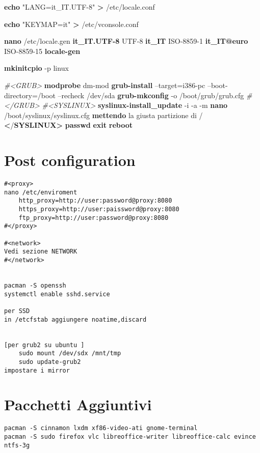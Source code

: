 \documentclass[]{article}
\newenvironment{Shaded}{}{}
\newcommand{\KeywordTok}[1]{\textcolor[rgb]{0.00,0.44,0.13}{\textbf{{#1}}}}
\newcommand{\StringTok}[1]{\textcolor[rgb]{0.25,0.44,0.63}{{#1}}}
\newcommand{\CommentTok}[1]{\textcolor[rgb]{0.38,0.63,0.69}{\textit{{#1}}}}
\newcommand{\NormalTok}[1]{{#1}}
\begin{document}
\begin{Shaded}
\begin{Highlighting}[]
\KeywordTok{echo} \StringTok{"LANG=it_IT.UTF-8"} \KeywordTok{>} \NormalTok{/etc/locale.conf  }

\KeywordTok{echo} \StringTok{"KEYMAP=it"} \KeywordTok{>} \NormalTok{/etc/vconsole.conf}

\KeywordTok{nano} \NormalTok{/etc/locale.gen}
    \KeywordTok{it_IT.UTF-8} \NormalTok{UTF-8  }
    \KeywordTok{it_IT} \NormalTok{ISO-8859-1  }
    \KeywordTok{it_IT@euro} \NormalTok{ISO-8859-15}
\KeywordTok{locale-gen}

\KeywordTok{mkinitcpio} \NormalTok{-p linux}

\CommentTok{#<GRUB>}
\KeywordTok{modprobe} \NormalTok{dm-mod}
\KeywordTok{grub-install} \NormalTok{--target=i386-pc --boot-directory=/boot --recheck /dev/sda}
\KeywordTok{grub-mkconfig} \NormalTok{-o /boot/grub/grub.cfg}
\CommentTok{#</GRUB>}
\CommentTok{#<SYSLINUX>}
\KeywordTok{syslinux-install_update} \NormalTok{-i -a -m}
\KeywordTok{nano} \NormalTok{/boot/syslinux/syslinux.cfg}
    \KeywordTok{mettendo} \NormalTok{la giusta partizione di /}
\KeywordTok{<}\NormalTok{/}\KeywordTok{SYSLINUX>}
\KeywordTok{passwd}
\KeywordTok{exit}
\KeywordTok{reboot}
\end{Highlighting}
\end{Shaded}

\section{Post configuration}\label{post-configuration}

\begin{verbatim}
#<proxy>
nano /etc/enviroment
    http_proxy=http://user:password@proxy:8080
    https_proxy=http://user:paissword@proxy:8080
    ftp_proxy=http://user:password@proxy:8080
#</proxy>

#<network>
Vedi sezione NETWORK
#</network>


pacman -S openssh
systemctl enable sshd.service

per SSD
in /etcfstab aggiungere noatime,discard


[per grub2 su ubuntu ]
    sudo mount /dev/sdx /mnt/tmp
    sudo update-grub2
impostare i mirror
\end{verbatim}

\section{Pacchetti Aggiuntivi}\label{pacchetti-aggiuntivi}

\begin{verbatim}
pacman -S cinnamon lxdm xf86-video-ati gnome-terminal
pacman -S sudo firefox vlc libreoffice-writer libreoffice-calc evince ntfs-3g
\end{verbatim}
\end{document}
